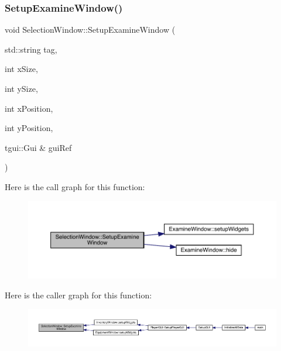 \subsubsection{\texorpdfstring{Setup\+Examine\+Window()}{SetupExamineWindow()}}
{\footnotesize\ttfamily void Selection\+Window\+::\+Setup\+Examine\+Window (\begin{DoxyParamCaption}\item[{std\+::string}]{tag,  }\item[{int}]{x\+Size,  }\item[{int}]{y\+Size,  }\item[{int}]{x\+Position,  }\item[{int}]{y\+Position,  }\item[{tgui\+::\+Gui \&}]{gui\+Ref }\end{DoxyParamCaption})}

Here is the call graph for this function\+:
\nopagebreak
\begin{figure}[H]
\begin{center}
\leavevmode
\includegraphics[width=350pt]{db/d9c/class_selection_window_a364adfebc05e660c153d58117762ed97_cgraph}
\end{center}
\end{figure}
Here is the caller graph for this function\+:
\nopagebreak
\begin{figure}[H]
\begin{center}
\leavevmode
\includegraphics[width=350pt]{db/d9c/class_selection_window_a364adfebc05e660c153d58117762ed97_icgraph}
\end{center}
\end{figure}
\mbox{\label{class_selection_window_a114554837c81ec32275741764bfccdc0}} 
